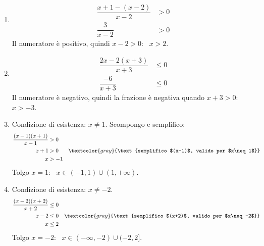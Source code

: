 \begin{question}[ID=2.3, subtitle={Disequazioni frazionarie con semplificazioni}, difficulty=media, tags={disequazioni frazionarie}]
\begin{explanation}
\begin{enumerate}
\[\begin{aligned}
    \dfrac{x}{x+1} &\leq 0 && \textcolor{gray}{\text{divido per $-2$: il verso si inverte}}
    \end{aligned}\]
    Discordi tra $-1$ e $0$; $x=0$ accettato: \ $x\in(-1,0]$.
    \item \[\begin{aligned}
    \dfrac{x+1-(x-2)}{x-2} &> 0\\
    \dfrac{3}{x-2} &> 0
    \end{aligned}\]
    Il numeratore è positivo, quindi $x-2>0$: \ $x>2$.
    \item \[\begin{aligned}
    \dfrac{2x-2(x+3)}{x+3} &\leq 0\\
    \dfrac{-6}{x+3} &\leq 0
    \end{aligned}\]
    Il numeratore è negativo, quindi la frazione è negativa quando $x+3>0$: \ $x>-3$.
    \item Condizione di esistenza: $x\neq 1$. Scompongo e semplifico:
    \[\begin{aligned}
    \dfrac{(x-1)(x+1)}{x-1} &> 0\\
    x+1 &> 0 && \textcolor{gray}{\text{semplifico $(x-1)$, valido per $x\neq1$}}\\
    x &> -1
    \end{aligned}\]
    Tolgo $x=1$: \ $x\in(-1,1)\cup(1,+\infty)$.
    \item Condizione di esistenza: $x\neq -2$.
    \[\begin{aligned}
    \dfrac{(x-2)(x+2)}{x+2} &\leq 0\\
    x-2 &\leq 0 && \textcolor{gray}{\text{semplifico $(x+2)$, valido per $x\neq-2$}}\\
    x &\leq 2
    \end{aligned}\]
    Tolgo $x=-2$: \ $x\in(-\infty,-2)\cup(-2,2]$.
\end{enumerate}
\end{explanation}
\end{question}


